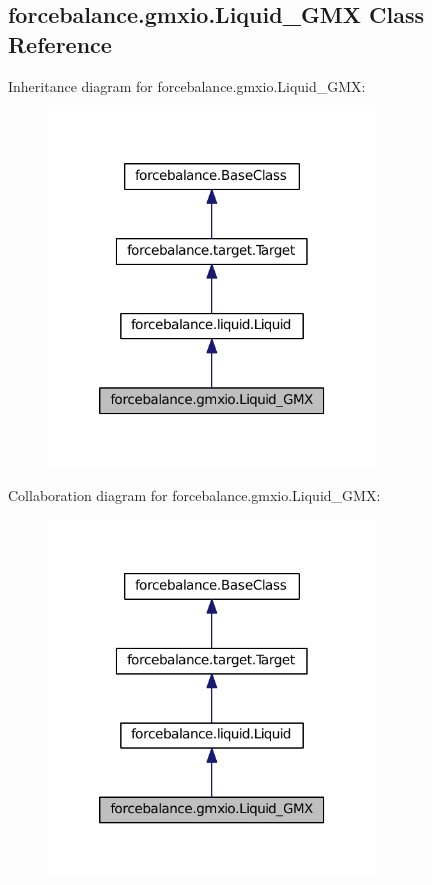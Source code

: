 \hypertarget{classforcebalance_1_1gmxio_1_1Liquid__GMX}{\subsection{forcebalance.\-gmxio.\-Liquid\-\_\-\-G\-M\-X \-Class \-Reference}
\label{classforcebalance_1_1gmxio_1_1Liquid__GMX}
}


\-Inheritance diagram for forcebalance.\-gmxio.\-Liquid\-\_\-\-G\-M\-X\-:
\nopagebreak
\begin{figure}[H]
\begin{center}
\leavevmode
\includegraphics[width=246pt]{classforcebalance_1_1gmxio_1_1Liquid__GMX__inherit__graph}
\end{center}
\end{figure}


\-Collaboration diagram for forcebalance.\-gmxio.\-Liquid\-\_\-\-G\-M\-X\-:
\nopagebreak
\begin{figure}[H]
\begin{center}
\leavevmode
\includegraphics[width=246pt]{classforcebalance_1_1gmxio_1_1Liquid__GMX__coll__graph}
\end{center}
\end{figure}
